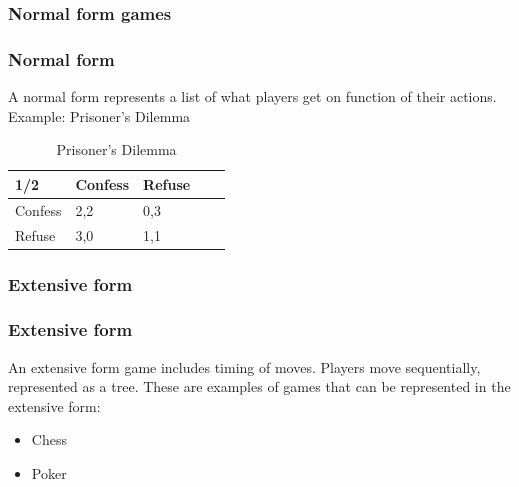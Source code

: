 \documentclass[aspectratio=169]{beamer}
\begin{document}
\begin{frame}
\subsubsection{Normal form games}
  \frametitle{Normal form}   %
A normal form represents a list of what players get on function of their actions. Example: Prisoner's Dilemma
\begin{table}[h!]
\centering
\begin{tabular}{lllll}

\multicolumn{1}{l}{1/2} \vline  & \multicolumn{1}{l}{Confess} & \multicolumn{1}{l}{Refuse}  \\ 
\hline
Confess                       &2,2                                  & 0,3				
\\
Refuse                          &3,0                                    & 1,1                                     
                          
\end{tabular}
\caption{Prisoner's Dilemma}
\label{table:7}
\end{table}
  
\end{frame}
\note[enumerate]       %
{                      %

}
\begin{frame}
\subsubsection{Extensive form}
  \frametitle{Extensive form}   %
An extensive form game includes timing of moves. Players move sequentially, represented as a tree. These are examples of games that can be represented in the extensive form:
\begin{itemize}
	\item<1-> Chess 
	\item<2-> Poker 
 \end{itemize}
  
\end{frame}
\end{document}
